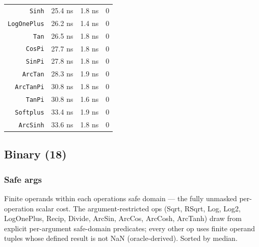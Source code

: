 \begin{table}[h]
\begin{tabulary}{\linewidth}{R R R R}
\texttt{Sinh} & 25.4 ns & 1.8 ns & 0 \\
\texttt{LogOnePlus} & 26.2 ns & 1.4 ns & 0 \\
\texttt{Tan} & 26.5 ns & 1.8 ns & 0 \\
\texttt{CosPi} & 27.7 ns & 1.8 ns & 0 \\
\texttt{SinPi} & 27.8 ns & 1.8 ns & 0 \\
\texttt{ArcTan} & 28.3 ns & 1.9 ns & 0 \\
\texttt{ArcTanPi} & 30.8 ns & 1.8 ns & 0 \\
\texttt{TanPi} & 30.8 ns & 1.6 ns & 0 \\
\texttt{Softplus} & 33.4 ns & 1.9 ns & 0 \\
\texttt{ArcSinh} & 33.6 ns & 1.8 ns & 0 \\
\bottomrule
\end{tabulary}

\end{table}




\clearpage



\subsection{Binary (18)}



\label{9493958918153706001}{}


\subsubsection{Safe args}



\label{1931488528371625443}{}


Finite operands within each operation{\textquotesingle}s safe domain — the fully unmasked per-operation scalar cost. The argument-restricted ops (Sqrt, RSqrt, Log, Log2, LogOnePlus, Recip, Divide, ArcSin, ArcCos, ArcCosh, ArcTanh) draw from explicit per-argument safe-domain predicates; every other op uses finite operand tuples whose defined result is not NaN (oracle-derived). Sorted by median.




